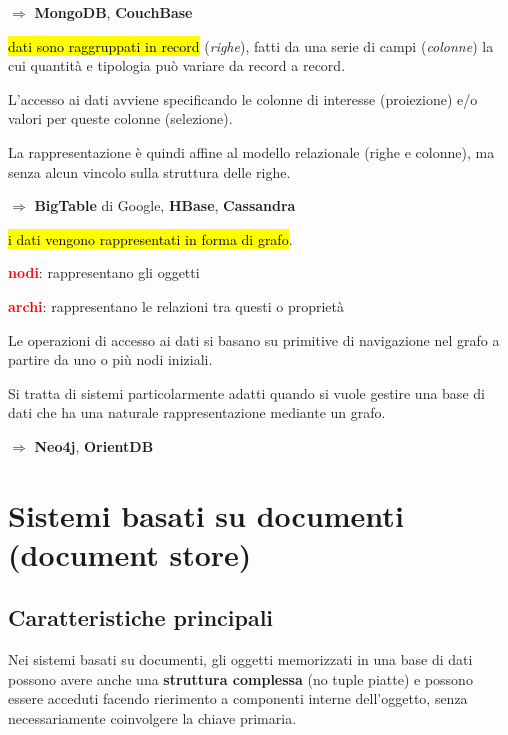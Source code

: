 \documentclass[12pt, a4paper, oneside]{book}
\begin{document}
\begin{description}[labelindent=0.5cm]
      \smallskip
      $\Rightarrow$ \textbf{MongoDB}, \textbf{CouchBase}

      \bigskip
      \item[\textcolor{azzurrino}{sistemi basati su colonne (column store)}:] \hl{dati sono raggruppati in record} (\textit{righe}), fatti da una serie di campi (\textit{colonne})
      la cui quantità e tipologia può variare da record a record.

      L'accesso ai dati avviene specificando le colonne di interesse (proiezione) e/o valori per queste colonne (selezione).

      La rappresentazione è quindi affine al modello relazionale (righe e colonne), ma senza alcun vincolo sulla struttura delle righe.

      \smallskip
      $\Rightarrow$ \textbf{BigTable} di Google, \textbf{HBase}, \textbf{Cassandra}

      \bigskip
      \item[\textcolor{azzurrino}{sistemi a grafo (graph store)}:]
      \hl{i dati vengono rappresentati in forma di grafo}.

      \smallskip
      \hspace*{0.5cm}\textcolor{red}{\textbf{nodi}}: rappresentano gli oggetti

      \smallskip
      \hspace*{0.5cm}\textcolor{red}{\textbf{archi}}: rappresentano le relazioni tra questi o proprietà

      \smallskip
      Le operazioni di accesso ai dati si basano su primitive di navigazione nel grafo a partire da uno o più nodi iniziali.

      Si tratta di sistemi particolarmente adatti quando si vuole gestire una base di dati che ha una naturale rappresentazione mediante un grafo.

      \smallskip
      $\Rightarrow$ \textbf{Neo4j}, \textbf{OrientDB}

    \end{description}


    \section{Sistemi basati su documenti (document store)}

    \subsection{Caratteristiche principali}
    Nei sistemi basati su documenti, gli oggetti memorizzati in una base di dati possono avere anche una \textcolor{azzurrino}{\textbf{struttura complessa}} (no tuple piatte) e possono essere acceduti facendo rierimento a componenti interne dell'oggetto, senza necessariamente coinvolgere la chiave primaria.
\end{document}
